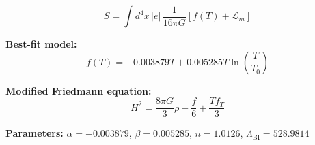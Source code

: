 
\begin{equation}
  S = \int d^4x \, |e| \, \frac{1}{16\pi G} \left[ f(T) + \mathcal{L}_m \right]
\end{equation}

\textbf{Best-fit model:}
\begin{equation}
  f(T) = -0.003879 T + 0.005285 T \ln\!\left(\frac{T}{T_0}\right)
\end{equation}

\textbf{Modified Friedmann equation:}
\begin{equation}
  H^2 = \frac{8\pi G}{3} \rho - \frac{f}{6} + \frac{T f_T}{3}
\end{equation}

\textbf{Parameters:}
$\alpha = -0.003879$, \quad
$\beta = 0.005285$, \quad
$n = 1.0126$, \quad
$\Lambda_{\text{BI}} = 528.9814$